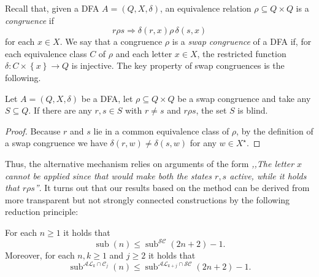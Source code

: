 \documentclass{ws-ijmpc}
\DeclareMathOperator{\sub}{sub}
\begin{document}
Recall that, given a DFA $A=\left(Q,X,\delta\right)$, an equivalence
relation $\rho\subseteq Q\times Q$ is a \emph{congruence }if 
\[
r\rho s\Rightarrow\delta\!\left(r,x\right)\rho\,\delta\!\left(s,x\right)
\]
for each $x\in X$. We say that a congruence $\rho$ is a \emph{swap
congruence} of a DFA if, for each equivalence class $C$ of $\rho$
and each letter $x\in X$, the restricted function $\delta:C\times\left\{ x\right\} \rightarrow Q$
is injective. The key property of swap congruences is the following.
\begin{lemma}
Let $A=\left(Q,X,\delta\right)$ be a DFA, let $\rho\subseteq Q\times Q$
be a swap congruence and take any $S\subseteq Q$. If there are any
$r,s\in S$ with $r\neq s$ and $r\rho s$, the set $S$ is blind.\end{lemma}
\begin{proof}
Because $r$ and $s$ lie in a common equivalence class of $\rho$,
by the definition of a swap congruence we have $\delta\!\left(r,w\right)\neq\delta\!\left(s,w\right)$
for any $w\in X^{\star}$.
\end{proof}
Thus, the alternative mechanism relies on arguments of the form \emph{,,The
letter $x$ cannot be applied since that would make both the states
$r,s$ active, while it holds that $r\rho s$''}. It turns out that
our results based on the method can be derived from more transparent
but not strongly connected constructions by the following reduction
principle: 
\begin{lemma}
\label{lem: sub sc}For each $n\ge1$ it holds that 
\[
\sub\!\left(n\right)\le\sub^{\mathcal{SC}}\!\left(2n+2\right)-1.
\]
Moreover, for each $n,k\ge1$ and $j\ge2$ it holds that
\[
\sub^{\mathcal{AL}_{k}\cap\mathcal{C}_{j}}\!\left(n\right)\le\sub^{\mathcal{AL}_{k+j}\cap\mathcal{SC}}\!\left(2n+2\right)-1.
\]
\end{lemma}
\end{document}
